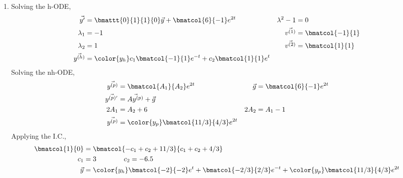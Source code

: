 \begin{enumerate}
    \item Solving the h-ODE,
          \begin{align}
              \vec{y'}                & = \bmattt{0}{1}{1}{0} \vec{y}
              + \bmatcol{6}{-1}e^{2t} &
              \lambda^{2} - 1         & = 0                             \\
              \lambda_1               & = -1                          &
              \vec{v^{(1)}}           & = \bmatcol{-1}{1}               \\
              \lambda_2               & = 1                           &
              \vec{v^{(2)}}           & = \bmatcol{1}{1}                \\
              \vec{y^{(h)}}           & = \color{y_h}
              c_1 \bmatcol{-1}{1}e^{-t} + c_2 \bmatcol{1}{1} e^{t}
          \end{align}
          Solving the nh-ODE,
          \begin{align}
              \vec{y^{(p)}}  & = \bmatcol{A_1}{A_2}e^{2t}              &
              \vec{g}        & = \bmatcol{6}{-1}e^{2t}                   \\
              \vec{y^{(p)'}} & = \vec{Ay^{(p)}} + \vec{g}                \\
              2A_1           & = A_2 + 6                               &
              2A_2           & = A_1 - 1                                 \\
              \vec{y^{(p)}}  & = \color{y_p} \bmatcol{11/3}{4/3}e^{2t}
          \end{align}
          Applying the I.C.,
          \begin{align}
              \bmatcol{1}{0} & = \bmatcol{-c_1 + c_2 + 11/3}
              {c_1 + c_2 + 4/3}                                     \\
              c_1            & = 3 \qquad\qquad c_2 = -6.5          \\
              \vec{y}        & = {\color{y_h} \bmatcol{-2}{-2}e^{t}
              + \bmatcol{-2/3}{2/3} e^{-t}} + {\color{y_p}
              \bmatcol{11/3}{4/3}e^{2t}}
          \end{align}


\end{enumerate}
